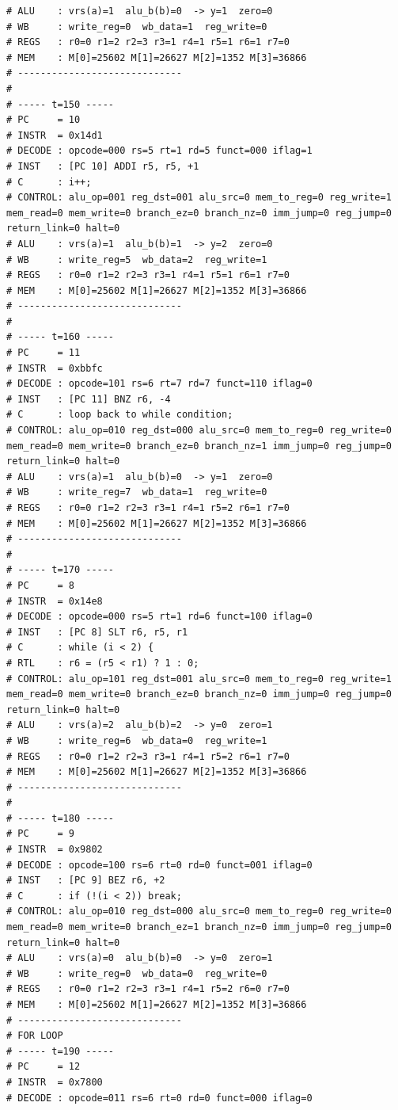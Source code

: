 \documentclass[12pt]{report}
\begin{document}
\begin{lstlisting}
# ALU    : vrs(a)=1  alu_b(b)=0  -> y=1  zero=0
# WB     : write_reg=0  wb_data=1  reg_write=0
# REGS   : r0=0 r1=2 r2=3 r3=1 r4=1 r5=1 r6=1 r7=0
# MEM    : M[0]=25602 M[1]=26627 M[2]=1352 M[3]=36866
# -----------------------------
# 
# ----- t=150 -----
# PC     = 10
# INSTR  = 0x14d1
# DECODE : opcode=000 rs=5 rt=1 rd=5 funct=000 iflag=1
# INST   : [PC 10] ADDI r5, r5, +1
# C      : i++;
# CONTROL: alu_op=001 reg_dst=001 alu_src=0 mem_to_reg=0 reg_write=1 mem_read=0 mem_write=0 branch_ez=0 branch_nz=0 imm_jump=0 reg_jump=0 return_link=0 halt=0
# ALU    : vrs(a)=1  alu_b(b)=1  -> y=2  zero=0
# WB     : write_reg=5  wb_data=2  reg_write=1
# REGS   : r0=0 r1=2 r2=3 r3=1 r4=1 r5=1 r6=1 r7=0
# MEM    : M[0]=25602 M[1]=26627 M[2]=1352 M[3]=36866
# -----------------------------
# 
# ----- t=160 -----
# PC     = 11
# INSTR  = 0xbbfc
# DECODE : opcode=101 rs=6 rt=7 rd=7 funct=110 iflag=0
# INST   : [PC 11] BNZ r6, -4
# C      : loop back to while condition;
# CONTROL: alu_op=010 reg_dst=000 alu_src=0 mem_to_reg=0 reg_write=0 mem_read=0 mem_write=0 branch_ez=0 branch_nz=1 imm_jump=0 reg_jump=0 return_link=0 halt=0
# ALU    : vrs(a)=1  alu_b(b)=0  -> y=1  zero=0
# WB     : write_reg=7  wb_data=1  reg_write=0
# REGS   : r0=0 r1=2 r2=3 r3=1 r4=1 r5=2 r6=1 r7=0
# MEM    : M[0]=25602 M[1]=26627 M[2]=1352 M[3]=36866
# -----------------------------
# 
# ----- t=170 -----
# PC     = 8
# INSTR  = 0x14e8
# DECODE : opcode=000 rs=5 rt=1 rd=6 funct=100 iflag=0
# INST   : [PC 8] SLT r6, r5, r1
# C      : while (i < 2) {
# RTL    : r6 = (r5 < r1) ? 1 : 0;
# CONTROL: alu_op=101 reg_dst=001 alu_src=0 mem_to_reg=0 reg_write=1 mem_read=0 mem_write=0 branch_ez=0 branch_nz=0 imm_jump=0 reg_jump=0 return_link=0 halt=0
# ALU    : vrs(a)=2  alu_b(b)=2  -> y=0  zero=1
# WB     : write_reg=6  wb_data=0  reg_write=1
# REGS   : r0=0 r1=2 r2=3 r3=1 r4=1 r5=2 r6=1 r7=0
# MEM    : M[0]=25602 M[1]=26627 M[2]=1352 M[3]=36866
# -----------------------------
# 
# ----- t=180 -----
# PC     = 9
# INSTR  = 0x9802
# DECODE : opcode=100 rs=6 rt=0 rd=0 funct=001 iflag=0
# INST   : [PC 9] BEZ r6, +2
# C      : if (!(i < 2)) break;
# CONTROL: alu_op=010 reg_dst=000 alu_src=0 mem_to_reg=0 reg_write=0 mem_read=0 mem_write=0 branch_ez=1 branch_nz=0 imm_jump=0 reg_jump=0 return_link=0 halt=0
# ALU    : vrs(a)=0  alu_b(b)=0  -> y=0  zero=1
# WB     : write_reg=0  wb_data=0  reg_write=0
# REGS   : r0=0 r1=2 r2=3 r3=1 r4=1 r5=2 r6=0 r7=0
# MEM    : M[0]=25602 M[1]=26627 M[2]=1352 M[3]=36866
# -----------------------------
# FOR LOOP
# ----- t=190 -----
# PC     = 12
# INSTR  = 0x7800
# DECODE : opcode=011 rs=6 rt=0 rd=0 funct=000 iflag=0

\end{lstlisting}
\end{document}
